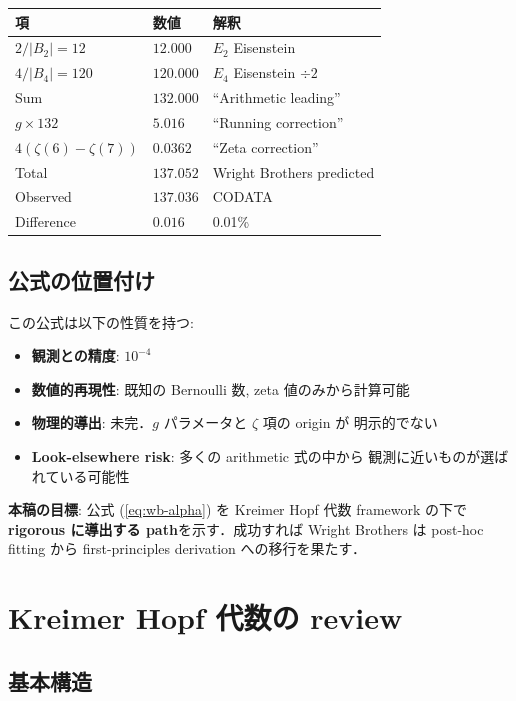 \documentclass[11pt,a4paper]{article}
\begin{document}
\begin{center}
\begin{tabular}{lll}
\toprule
項 & 数値 & 解釈 \\
\midrule
$2/|B_2| = 12$ & $12.000$ & $E_2$ Eisenstein \\
$4/|B_4| = 120$ & $120.000$ & $E_4$ Eisenstein $\div 2$ \\
Sum & $132.000$ & ``Arithmetic leading'' \\
$g \times 132$ & $5.016$ & ``Running correction''\\
$4(\zeta(6) - \zeta(7))$ & $0.0362$ & ``Zeta correction'' \\
\midrule
Total & $137.052$ & Wright Brothers predicted \\
Observed & $137.036$ & CODATA \\
Difference & $0.016$ & 0.01\% \\
\bottomrule
\end{tabular}
\end{center}

\subsection{公式の位置付け}

この公式は以下の性質を持つ:

\begin{itemize}
\item \textbf{観測との精度}: $10^{-4}$
\item \textbf{数値的再現性}: 既知の Bernoulli 数, zeta 値のみから計算可能
\item \textbf{物理的導出}: 未完．$g$ パラメータと $\zeta$ 項の origin が
明示的でない
\item \textbf{Look-elsewhere risk}: 多くの arithmetic 式の中から
観測に近いものが選ばれている可能性
\end{itemize}

\textbf{本稿の目標}: 公式 (\ref{eq:wb-alpha}) を Kreimer Hopf 代数
framework の下で\textbf{rigorous に導出する path}を示す．成功すれば
Wright Brothers は post-hoc fitting から first-principles derivation
への移行を果たす．

\section{Kreimer Hopf 代数の review}

\subsection{基本構造}
\end{document}
